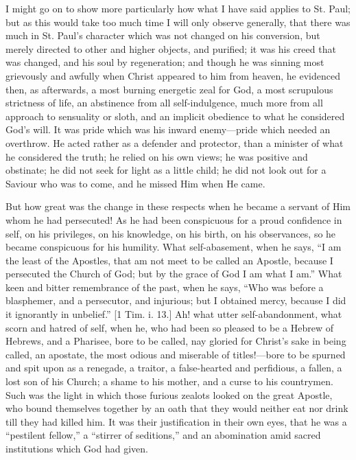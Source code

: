I might go on to show more particularly how what I have said
applies to St. Paul; but as this would take too much time I will only
observe generally, that there was much in St. Paul's character which
was not changed on his conversion, but merely directed to other and
higher objects, and purified; it was his creed that was changed, and
his soul by regeneration; and though he was sinning most grievously
and awfully when Christ appeared to him from heaven, he evidenced
then, as afterwards, a most burning energetic zeal for God, a most
scrupulous strictness of life, an abstinence from all self-indulgence,
much more from all approach to sensuality or sloth, and an implicit
obedience to what he considered God's will. It was pride which was his
inward enemy—pride which needed an overthrow. He acted rather as a
defender and protector, than a minister of what he considered the
truth; he relied on his own views; he was positive and obstinate; he
did not seek for light as a little child; he did not look out for a
Saviour who was to come, and he missed Him when He came.

But how great was the change in these respects when he became a
servant of Him whom he had persecuted! As he had been conspicuous for
a proud confidence in self, on his privileges, on his knowledge, on
his birth, on his observances, so he became conspicuous for his
humility. What self-abasement, when he says, ``I am the least of
the Apostles, that am not meet to be called an Apostle, because I
persecuted the Church of God; but by the grace of God I am what I
am.'' What keen and bitter remembrance of the past, when he says,
``Who was before a blasphemer, and a persecutor, and injurious;
but I obtained mercy, because I did it ignorantly in unbelief.''
[1 Tim. i. 13.] Ah! what utter self-abandonment, what scorn and hatred
of self, when he, who had been so pleased to be a Hebrew of Hebrews,
and a Pharisee, bore to be called, nay gloried for Christ's sake in
being called, an apostate, the most odious and miserable of titles!—bore
to be spurned and spit upon as a renegade, a traitor, a false-hearted
and perfidious, a fallen, a lost son of his Church; a shame to his
mother, and a curse to his countrymen. Such was the light in which
those furious zealots looked on the great Apostle, who bound
themselves together by an oath that they would neither eat nor drink
till they had killed him. It was their justification in their own
eyes, that he was a ``pestilent fellow,'' a ``stirrer of
seditions,'' and an abomination amid sacred institutions which God
had given.

